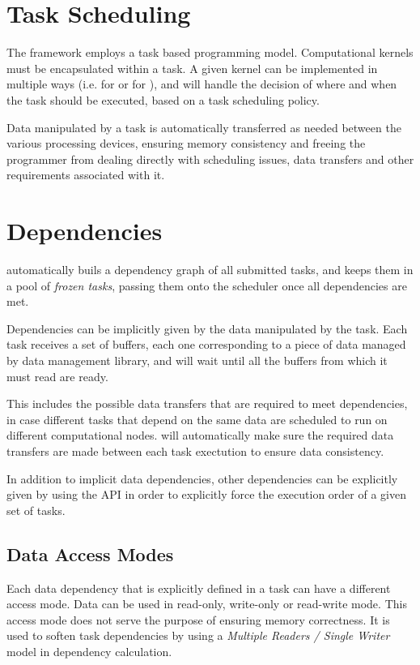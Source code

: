 \documentclass[main.tex]{subfiles}
\begin{document}
\section{Task Scheduling}

The framework employs a task based programming model. Computational kernels must be encapsulated within a task. A given kernel can be implemented in multiple ways (i.e. for \cpus or for \cuda), and \starpu will handle the decision of where and when the task should be executed, based on a task scheduling policy.

Data manipulated by a task is automatically transferred as needed between the various processing devices, ensuring memory consistency and freeing the programmer from dealing directly with scheduling issues, data transfers and other requirements associated with it.

\section{Dependencies}

\starpu automatically buils a dependency graph of all submitted tasks, and keeps them in a pool of \emph{frozen tasks}, passing them onto the scheduler once all dependencies are met.

Dependencies can be implicitly given by the data manipulated by the task. Each task receives a set of buffers, each one corresponding to a piece of data managed by \starpu data management library, and will wait until all the buffers from which it must read are ready.

This includes the possible data transfers that are required to meet dependencies, in case different tasks that depend on the same data are scheduled to run on different computational nodes. \starpu will automatically make sure the required data transfers are made between each task exectution to ensure data consistency.

In addition to implicit data dependencies, other dependencies can be explicitly given by using the \starpu API in order to explicitly force the execution order of a given set of tasks.

\subsection{Data Access Modes}

Each data dependency that is explicitly defined in a task can have a different access mode. Data can be used in read-only, write-only or read-write mode. This access mode does not serve the purpose of ensuring memory correctness. It is used to soften task dependencies by using a \emph{Multiple Readers / Single Writer} model in dependency calculation.
\end{document}
